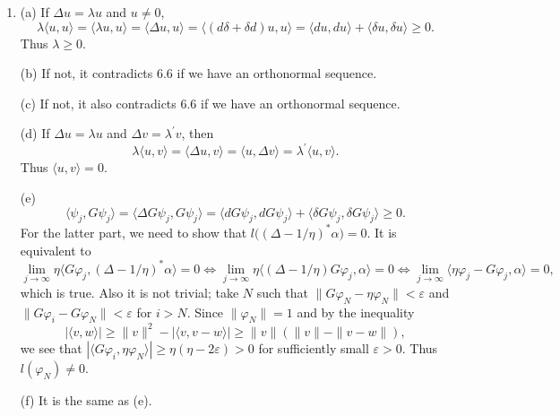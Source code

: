 \begin{enumerate}
If a holomorphic function $f$ has compact support, then by Green's 1st identity,
\[\int_{\partial D} f \frac{\partial f}{\partial n}
=\int_{D}\langle \operatorname{grad} f, \operatorname{grad} f\rangle-\int_{D} f \Delta f\]
for every disc $D$. Since $\Delta f=0$, 
if we take a sufficiently large disc $D$, then it becomes
\[\int_{D} \langle \operatorname{grad} f, \operatorname{grad} f \rangle=0.\]
By letting the radius of $D$ go to infinity, we see that 
\[\int_{\mathbb{C}}\langle\operatorname{grad} f, \operatorname{grad} f\rangle=0,\]
and it means $\operatorname{grad} f=0$ everywhere, or $f$ is constant. 
But $f$ has compact support, so $f$ has to be zero everywhere.
\item (a) If $\Delta u=\lambda u$ and $u \neq 0$,
\[\lambda\langle u, u\rangle=\langle\lambda u, u\rangle
=\langle\Delta u, u\rangle=\langle(d \delta+\delta d) u, u\rangle
=\langle d u, d u\rangle+\langle\delta u, \delta u\rangle \geq 0.\]
Thus $\lambda \geq 0$.

(b) If not, it contradicts 6.6 if we have an orthonormal sequence.

(c) If not, it also contradicts 6.6 if we have an orthonormal sequence.

(d) If $\Delta u=\lambda u$ and $\Delta v=\lambda^{\prime} v$, then
\[\lambda\langle u, v\rangle=\langle\Delta u, v\rangle
=\langle u, \Delta v\rangle=\lambda^{\prime}\langle u, v\rangle.\]
Thus $\langle u, v\rangle=0$.

(e) \[\langle\psi_{j}, G\psi_{j}\rangle=\langle\Delta G\psi_{j}, G\psi_{j}\rangle
=\langle dG\psi_{j}, dG\psi_{j}\rangle+\langle\delta G\psi_{j}, \delta G\psi_{j}\rangle \geq 0.\]
For the latter part, we need to show that $l\big((\Delta-1/\eta)^{*} \alpha\big)=0$. 
It is equivalent to
\[\lim_{j \rightarrow \infty} \eta\langle G\varphi_{j},(\Delta-1/\eta)^{*} \alpha\rangle=0 
\Leftrightarrow \lim_{j \rightarrow \infty} \eta\langle(\Delta-1/\eta) G\varphi_{j}, \alpha\rangle=0 
\Leftrightarrow \lim_{j \rightarrow \infty}\langle\eta \varphi_{j}-G\varphi_{j}, \alpha\rangle=0,\]
which is true. Also it is not trivial; take $N$ such that $\|G\varphi_{N}-\eta\varphi_{N}\|<\varepsilon$ 
and $\|G\varphi_{i}-G\varphi_{N}\|<\varepsilon$ for $i>N$. 
Since $\|\varphi_{N}\|=1$ and by the inequality
\[|\langle v, w\rangle| \geq \|v\|^2-|\langle v, v-w\rangle| \geq \|v\| (\|v\|-\|v-w\|),\]
we see that $|\langle G\varphi_{i}, \eta \varphi_{N}\rangle| \geq \eta(\eta-2 \varepsilon)>0$ for sufficiently small $\varepsilon>0$. 
Thus $l(\varphi_{N}) \neq 0$.

(f) It is the same as (e).


\end{enumerate}
